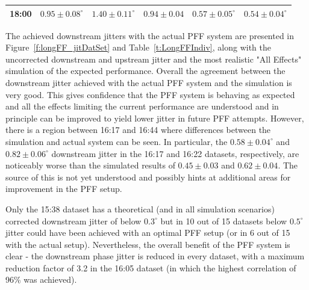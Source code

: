 {\begin{minipage}{\linewidth}
\begin{tabular}{| c  c  c  c  c  c  |}
18:00 & \(0.95\pm0.08^\circ\) & \(1.40\pm0.11^\circ\) & \(0.94\pm0.04\) & \(0.57\pm0.05^\circ\) & \(0.54\pm0.04^\circ\) \\ \hline
    \end{tabular}
  	\label{t:LongFFIndiv}
\end{minipage}
\pagebreak
}

The achieved downstream jitters with the actual PFF system are presented in Figure~\ref{f:longFF_jitDatSet} and Table~\ref{t:LongFFIndiv}, along with the uncorrected downstream and upstream jitter and the most realistic "All Effects" simulation of the expected performance. Overall the agreement between the downstream jitter achieved with the actual PFF system and the simulation is very good. This gives confidence that the PFF system is behaving as expected and all the effects limiting the current performance are understood and in principle can be improved to yield lower jitter in future PFF attempts. However, there is a region between 16:17 and 16:44 where differences between the simulation and actual system can be seen. In particular, the \(0.58\pm0.04^\circ\) and \(0.82\pm0.06^\circ\) downstream jitter in the 16:17 and 16:22 datasets, respectively, are noticeably worse than the simulated results of \(0.45\pm0.03\) and \(0.62\pm0.04\). The source of this is not yet understood and possibly hints at additional areas for improvement in the PFF setup.

Only the 15:38 dataset has a theoretical (and in all simulation scenarios) corrected downstream jitter of below \(0.3^\circ\) but in 10 out of 15 datasets below \(0.5^\circ\) jitter could have been achieved with an optimal PFF setup (or in 6 out of 15 with the actual setup). Nevertheless, 
the overall benefit of the PFF system is clear - the downstream phase jitter is reduced in every dataset, with a maximum reduction factor of 3.2 in the 16:05 dataset (in which the highest correlation of 96\% was achieved).



